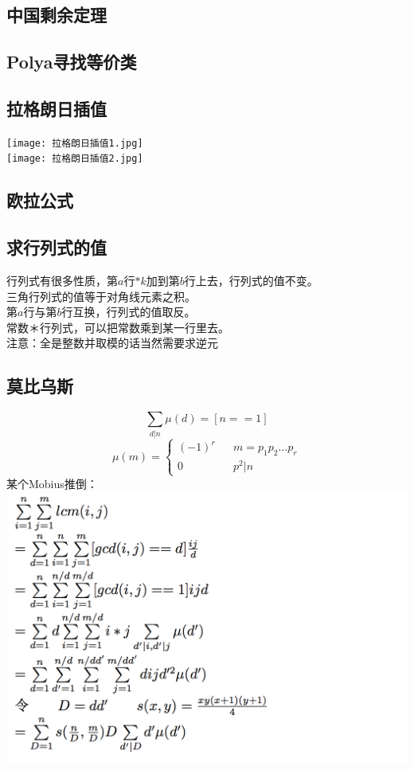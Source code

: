 \documentclass[11pt]{article}
\begin{document}
		\subsection{中国剩余定理}
		
		\subsection{Polya寻找等价类}
		
		\subsection{拉格朗日插值}
		\texttt{[image: 拉格朗日插值1.jpg]}\\
		\texttt{[image: 拉格朗日插值2.jpg]} 
		\subsection{欧拉公式}
		
		\subsection{求行列式的值}
			行列式有很多性质，第$a$行$*k$加到第$b$行上去，行列式的值不变。\\
			三角行列式的值等于对角线元素之积。\\
			第$a$行与第$b$行互换，行列式的值取反。\\
			常数＊行列式，可以把常数乘到某一行里去。\\
			注意：全是整数并取模的话当然需要求逆元
		\subsection{莫比乌斯}
		$$\sum_{d|n}\mu(d)=[n==1]$$ 
		$$ \mu(m)=\left\{
		\begin{array}{rcl}
		(-1)^r      &      & {m=p_1p_2...p_r}\\
		0  &      & {p^2|n}
		\end{array} \right.
		$$
		某个Mobius推倒：\\
		\includegraphics{Mobius.png}
\end{document}
